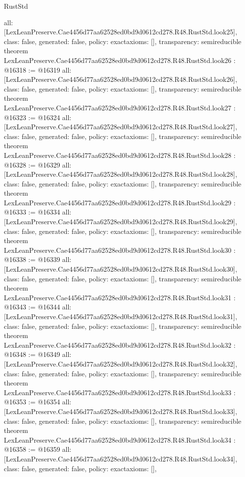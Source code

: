 \begin{lexlean}{RustStd}
\begin{coremodule}
{  all: [LexLeanPreserve.Cae4456d77aa62528ed0bd9d0612cd278.R48.RustStd.look25],
  class: false,
  generated: false,
  policy: exact{axioms: []},
  transparency: semireducible
}
theorem LexLeanPreserve.Cae4456d77aa62528ed0bd9d0612cd278.R48.RustStd.look26 : @16318 := @16319 {
  all: [LexLeanPreserve.Cae4456d77aa62528ed0bd9d0612cd278.R48.RustStd.look26],
  class: false,
  generated: false,
  policy: exact{axioms: []},
  transparency: semireducible
}
theorem LexLeanPreserve.Cae4456d77aa62528ed0bd9d0612cd278.R48.RustStd.look27 : @16323 := @16324 {
  all: [LexLeanPreserve.Cae4456d77aa62528ed0bd9d0612cd278.R48.RustStd.look27],
  class: false,
  generated: false,
  policy: exact{axioms: []},
  transparency: semireducible
}
theorem LexLeanPreserve.Cae4456d77aa62528ed0bd9d0612cd278.R48.RustStd.look28 : @16328 := @16329 {
  all: [LexLeanPreserve.Cae4456d77aa62528ed0bd9d0612cd278.R48.RustStd.look28],
  class: false,
  generated: false,
  policy: exact{axioms: []},
  transparency: semireducible
}
theorem LexLeanPreserve.Cae4456d77aa62528ed0bd9d0612cd278.R48.RustStd.look29 : @16333 := @16334 {
  all: [LexLeanPreserve.Cae4456d77aa62528ed0bd9d0612cd278.R48.RustStd.look29],
  class: false,
  generated: false,
  policy: exact{axioms: []},
  transparency: semireducible
}
theorem LexLeanPreserve.Cae4456d77aa62528ed0bd9d0612cd278.R48.RustStd.look30 : @16338 := @16339 {
  all: [LexLeanPreserve.Cae4456d77aa62528ed0bd9d0612cd278.R48.RustStd.look30],
  class: false,
  generated: false,
  policy: exact{axioms: []},
  transparency: semireducible
}
theorem LexLeanPreserve.Cae4456d77aa62528ed0bd9d0612cd278.R48.RustStd.look31 : @16343 := @16344 {
  all: [LexLeanPreserve.Cae4456d77aa62528ed0bd9d0612cd278.R48.RustStd.look31],
  class: false,
  generated: false,
  policy: exact{axioms: []},
  transparency: semireducible
}
theorem LexLeanPreserve.Cae4456d77aa62528ed0bd9d0612cd278.R48.RustStd.look32 : @16348 := @16349 {
  all: [LexLeanPreserve.Cae4456d77aa62528ed0bd9d0612cd278.R48.RustStd.look32],
  class: false,
  generated: false,
  policy: exact{axioms: []},
  transparency: semireducible
}
theorem LexLeanPreserve.Cae4456d77aa62528ed0bd9d0612cd278.R48.RustStd.look33 : @16353 := @16354 {
  all: [LexLeanPreserve.Cae4456d77aa62528ed0bd9d0612cd278.R48.RustStd.look33],
  class: false,
  generated: false,
  policy: exact{axioms: []},
  transparency: semireducible
}
theorem LexLeanPreserve.Cae4456d77aa62528ed0bd9d0612cd278.R48.RustStd.look34 : @16358 := @16359 {
  all: [LexLeanPreserve.Cae4456d77aa62528ed0bd9d0612cd278.R48.RustStd.look34],
  class: false,
  generated: false,
  policy: exact{axioms: []},
}
\end{coremodule}
\end{lexlean}
